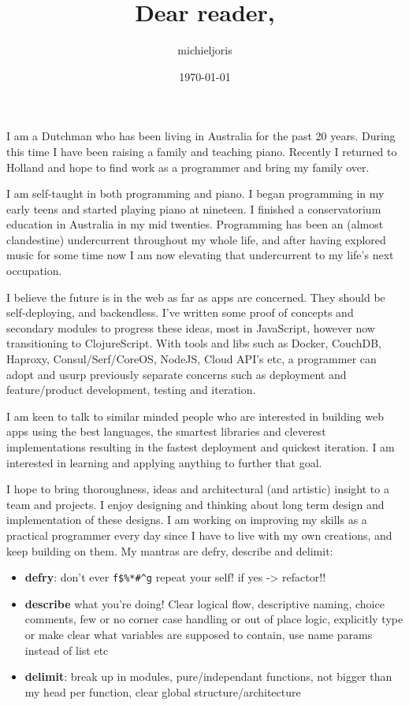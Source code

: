 \documentclass[11pt]{article}
\title{Dear reader,}
\author{michieljoris}
\date{\today}
\begin{document}
\maketitle

 
I am a Dutchman who has been living in Australia for the past 20 years. During this time I have been raising a family and teaching piano. Recently I returned to Holland and hope to find work as a programmer and bring my family over. 
 
I am self-taught in both programming and piano. I began programming in my early teens and started playing piano at nineteen. I finished a conservatorium education in Australia in my mid twenties. Programming has been an (almost clandestine) undercurrent throughout my whole life, and after having explored music for some time now I am now elevating that undercurrent to my life's next occupation. 
 
I believe the future is in the web as far as apps are concerned. They should be self-deploying, and backendless. I've written some proof of concepts and secondary modules to progress these ideas, most in JavaScript, however now transitioning to ClojureScript. With tools and libs such as Docker, CouchDB, Haproxy, Consul/Serf/CoreOS, NodeJS, Cloud API's  etc, a programmer can adopt and usurp previously separate concerns such as deployment and feature/product development, testing and iteration. 
 
I am keen to talk to similar minded people who are interested in building web apps using the best languages, the smartest libraries and cleverest implementations resulting in the fastest deployment and quickest iteration. I am interested in learning and applying anything to further that goal. 
 
I hope to bring thoroughness, ideas and architectural (and artistic) insight to a team and projects. I enjoy designing and thinking about long term design and implementation of these designs. I am working on improving my skills as a practical programmer every day since I have to live with my own creations, and keep building on them. My mantras are defry, describe and delimit:
\vspace{3mm} %
\renewcommand{\labelitemi}{\textbullet}
 
\begin{itemize}
\item \textbf{defry}: don't ever \verb~f$%*#^g~ repeat your self!
   if yes -> refactor!!
\item \textbf{describe} what you're doing!
   Clear logical flow, descriptive naming, choice comments, few or no corner case handling or out of place logic, explicitly type or make clear what variables are supposed to contain, use name params instead of list etc
\item \textbf{delimit}: break up in modules, pure/independant functions, not bigger than my head per function, clear global structure/architecture
\end{itemize}
 
\end{document}
